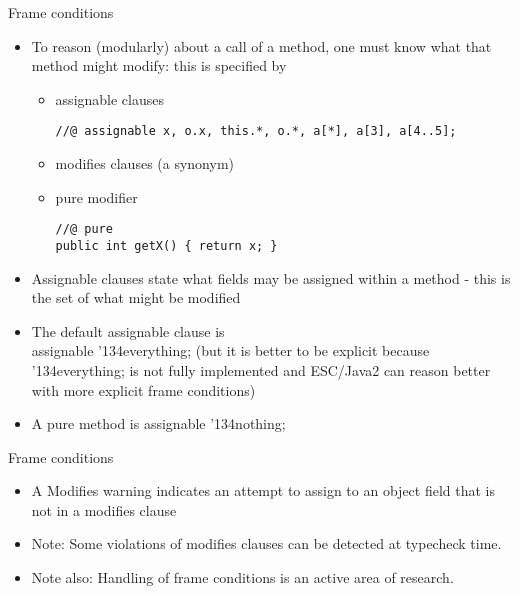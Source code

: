 \documentclass[
pdf,
nocolorBG,
slideColor,
cok,
]{prosper}
\newcommand{\bsl}{\char'134}
\begin{document}
\begin{slide}{Frame conditions}

\vspace*{-8ex}
\begin{itemize}
\item To reason (modularly) about a call of a method, one must know what that method might modify: this is specified by 
\begin{itemize}
\item {\knalblue assignable} clauses
{\tiny
\begin{verbatim}
//@ assignable x, o.x, this.*, o.*, a[*], a[3], a[4..5];
\end{verbatim}
}
\item {\knalblue modifies} clauses (a synonym)
\item {\knalblue pure} modifier
{\tiny
\begin{verbatim}
//@ pure
public int getX() { return x; }
\end{verbatim}
}

\end{itemize}
\item Assignable clauses state what fields may be assigned within a method
- this is the set of what might be modified
\item The default assignable clause is \\ {\knalblue assignable \bsl everything;} (but it is better to be explicit because {\knalblue \bsl everything;} is not fully implemented and ESC/Java2
can reason better with more explicit frame conditions)
\item A {\knalblue pure} method is  {\knalblue assignable \bsl nothing;}
\end{itemize}
\end{slide}

\begin{slide}{Frame conditions}

\vspace*{-6ex}
\begin{itemize}
\item A {\knalblue Modifies} warning indicates an attempt to assign to an object field that is not in a modifies clause
\item Note: Some violations of modifies clauses can be detected at typecheck time.
\item Note also:  Handling of frame conditions is an active area of research.
\end{itemize}
\end{slide}
\end{document}
